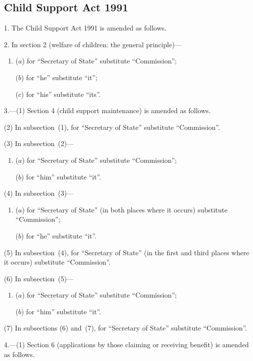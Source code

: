 \documentclass[12pt,a4paper]{article}
\begin{document}
\subsection*{Child Support Act 1991}

1. The Child Support Act 1991 is amended as follows.

\medskip

2. In section 2 (welfare of children: the general principle)—
\begin{enumerate}\item[]
($a$) for “Secretary of State” substitute “Commission”;

($b$) for “he” substitute “it”;

($c$) for “his” substitute “its”.
\end{enumerate}

\medskip

3.---(1) Section 4 (child support maintenance) is amended as follows.

(2) In subsection~(1), for “Secretary of State” substitute “Commission”.

(3) In subsection~(2)—
\begin{enumerate}\item[]
($a$) for “Secretary of State” substitute “Commission”;

($b$) for “him” substitute “it”.
\end{enumerate}

(4) In subsection~(3)—
\begin{enumerate}\item[]
($a$) for “Secretary of State” (in both places where it occurs) substitute “Commission”;

($b$) for “he” substitute “it”.
\end{enumerate}

(5) In subsection~(4), for “Secretary of State” (in the first and third places where it occurs) substitute “Commission”.

(6) In subsection~(5)—
\begin{enumerate}\item[]
($a$) for “Secretary of State” substitute “Commission”;

($b$) for “him” substitute “it”.
\end{enumerate}

(7) In subsections (6) and~(7), for “Secretary of State” substitute “Commission”.

\medskip

4.---(1) Section 6 (applications by those claiming or receiving benefit) is amended as follows.
\end{document}
